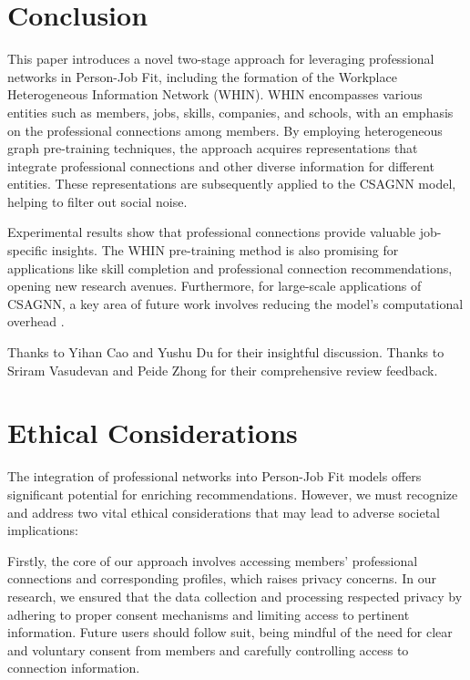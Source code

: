 \section{Conclusion}
This paper introduces a novel two-stage approach for leveraging professional networks in Person-Job Fit, including the formation of the Workplace Heterogeneous Information Network (WHIN). WHIN encompasses various entities such as members, jobs, skills, companies, and schools, with an emphasis on the professional connections among members. By employing heterogeneous graph pre-training techniques, the approach acquires representations that integrate professional connections and other diverse information for different entities. These representations are subsequently applied to the CSAGNN model, helping to filter out social noise.

Experimental results show that professional connections provide valuable job-specific insights. The WHIN pre-training method is also promising for applications like skill completion and professional connection recommendations, opening new research avenues. Furthermore, for large-scale applications of CSAGNN, a key area of future work involves reducing the model's computational overhead \cite{lin2020pagraph, li2020compression, li2021trace}.

\begin{acks}
Thanks to Yihan Cao and Yushu Du for their insightful discussion. Thanks to Sriram Vasudevan and Peide Zhong for their comprehensive review feedback.
\end{acks}

\section*{Ethical Considerations}

The integration of professional networks into Person-Job Fit models offers significant potential for enriching recommendations. However, we must recognize and address two vital ethical considerations that may lead to adverse societal implications:

Firstly, the core of our approach involves accessing members' professional connections and corresponding profiles, which raises privacy concerns. In our research, we ensured that the data collection and processing respected privacy by adhering to proper consent mechanisms and limiting access to pertinent information. Future users should follow suit, being mindful of the need for clear and voluntary consent from members and carefully controlling access to connection information.

